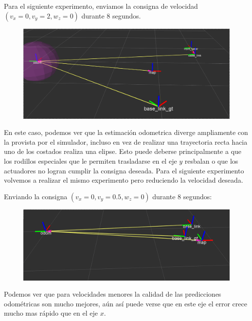 Para el siguiente experimento, enviamos la consigna de velocidad $(v_x = 0, v_y=2, w_z=0)$ durante $8$ segundos.

\begin{center}
\begin{figure}[!htb]
\includegraphics[width=\linewidth]{pruebasOdom/8segIzquierda2.png}
\end{figure}
\FloatBarrier
\end{center}
En este caso, podemos ver que la estimación odometrica diverge ampliamente con la provista por el simulador, incluso en vez de realizar una trayectoria recta hacia uno de los costados realiza una elipse. Esto puede deberse principalmente a que los rodillos especiales que le permiten trasladarse en el eje $y$ resbalan o que los actuadores no logran cumplir la consigna deseada. Para el siguiente experimento volvemos a realizar el mismo experimento pero reduciendo la velocidad deseada.

Enviando la consigna $(v_x = 0, v_y=0.5,w_z=0)$ durante 8 segundos: 

\begin{center}
\begin{figure}[!htb]
\includegraphics[width=\linewidth]{pruebasOdom/8segIzquierda05.png}
\end{figure}
\FloatBarrier
\end{center}
Podemos ver que para velocidades menores la calidad de las predicciones odométricas son mucho mejores, aún así puede verse que en este eje el error crece mucho mas rápido que en el eje $x$.

